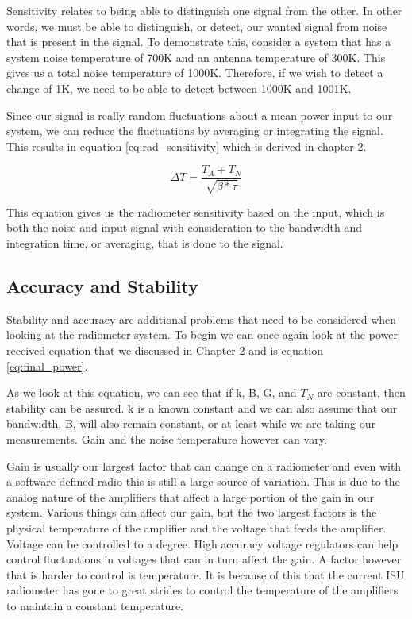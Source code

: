 Sensitivity relates to being able to distinguish one signal from the other.  In other words, we must be able to distinguish, or detect, our wanted signal from noise that is present in the signal.  To demonstrate this, consider a system that has a system noise temperature of 700K and an antenna temperature of 300K.  This gives us a total noise temperature of 1000K.  Therefore, if we wish to detect a change of 1K, we need to be able to detect between 1000K and 1001K.

Since our signal is really random fluctuations about a mean power input to our system, we can reduce the fluctuations by averaging or integrating the signal.  This results in equation \ref{eq:rad_sensitivity} which is derived in chapter 2.

\begin{equation} \label{eq:rad_sensitivity}
\Delta T=\frac{T_{A}+T_{N}}{\sqrt{\beta * \tau}}
\end{equation}


This equation gives us the radiometer sensitivity based on the input, which is both the noise and input signal with consideration to the bandwidth and integration time, or averaging, that is done to the signal.  

\subsection{Accuracy and Stability}
Stability and accuracy are additional problems that need to be considered when looking at the radiometer system.  To begin we can once again look at the power received equation that we discussed in Chapter 2 and is equation \ref{eq:final_power}.

As we look at this equation, we can see that if k, B, G, and $T_{N}$ are constant, then stability can be assured.  k is a known constant and we can also assume that our bandwidth, B, will also remain constant, or at least while we are taking our measurements.  Gain and the noise temperature however can vary.  

Gain is usually our largest factor that can change on a radiometer and even with a software defined radio this is still a large source of variation.  This is due to the analog nature of the amplifiers that affect a large portion of the gain in our system.  Various things can affect our gain, but the two largest factors is the physical temperature of the amplifier and the voltage that feeds the amplifier.  Voltage can be controlled to a degree.  High accuracy voltage regulators can help control fluctuations in voltages that can in turn affect the gain.  A factor however that is harder to control is temperature.  It is because of this that the current ISU radiometer has gone to great strides to control the temperature of the amplifiers to maintain a constant temperature.

